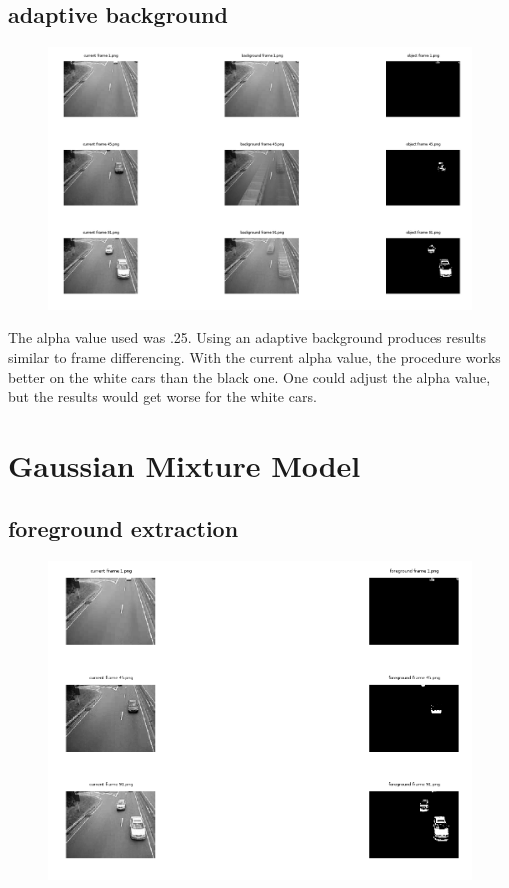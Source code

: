 \documentclass{article}
\begin{document}
	\subsection{adaptive background}
	\begin{figure}[H]
		\includegraphics[width=\linewidth]{Q2/partD/partD.png}
	\end{figure}
	The alpha value used was .25. Using an adaptive background produces results similar to frame differencing. With the current alpha value, the procedure works better on the white cars than the black one. One could adjust the alpha value, but the results would get worse for the white cars.
	
	\newpage
	\section{Gaussian Mixture Model}
	
	\subsection{foreground extraction}
	\begin{figure}[H]
		\includegraphics[width=\linewidth]{Q3/partA/partA.png}
	\end{figure}
	
\end{document}
